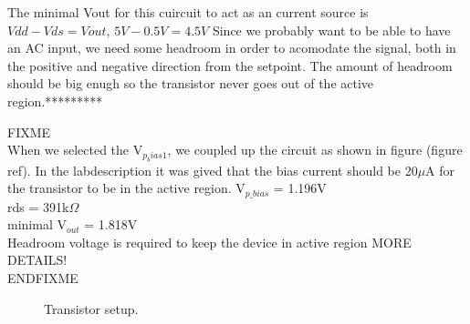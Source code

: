 \documentclass[a4paper,english,11pt]{article}
\begin{document}
The minimal Vout for this cuircuit to act as an current source is $Vdd - Vds = Vout$, $5 V - 0.5 V = 4.5 V$
Since we probably want to be able to have an AC input, we need some headroom in order to acomodate the signal, both in the positive and negative direction from the setpoint.
The amount of headroom should be big enugh so the transistor never goes out of the active region.*********

\colorbox{red!30}{FIXME}\\
When we selected the V$_{p_bias1}$, we coupled up the circuit as shown in figure (figure ref). In the labdescription it was
gived that the bias current should be 20$\mu$A for the transistor to be in the active region.
V$_{p\_bias}$ = 1.196V\\
rds = 391k$\varOmega$\\
minimal V$_{out}$ = 1.818V\\
Headroom voltage is required to keep the device in active region MORE DETAILS!\\
\colorbox{red!30}{ENDFIXME}\\
    



\begin{figure}[htbp]
 \centering
  \caption{Transistor setup.}
  \label{fig:tran-setup}	
\end{figure}



\newpage
\end{document}
